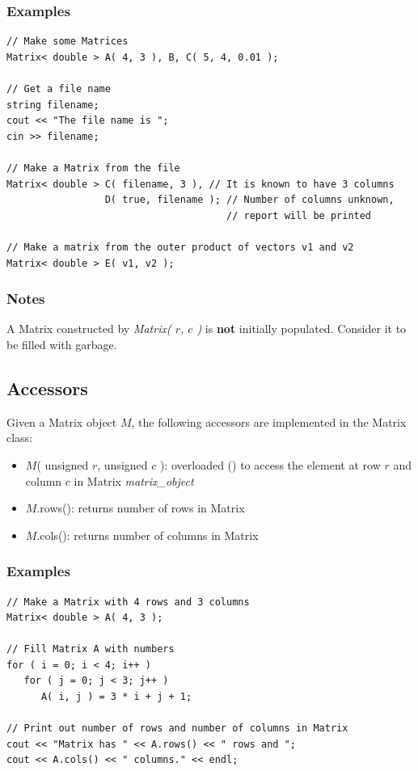 \documentclass{report}
\begin{document}
\subsubsection{Examples}

\begin{verbatim}
// Make some Matrices
Matrix< double > A( 4, 3 ), B, C( 5, 4, 0.01 );

// Get a file name
string filename;
cout << "The file name is ";
cin >> filename;

// Make a Matrix from the file
Matrix< double > C( filename, 3 ), // It is known to have 3 columns
                 D( true, filename ); // Number of columns unknown,
                                      // report will be printed

// Make a matrix from the outer product of vectors v1 and v2
Matrix< double > E( v1, v2 );
\end{verbatim}

\subsubsection{Notes}

A Matrix constructed by {\em Matrix( $r$, $c$ )} is {\bf not}
initially populated.  Consider it to be filled with garbage.

\subsection{Accessors}

Given a Matrix object $M$, the following accessors are implemented in
the Matrix class:

\begin{itemize}
\item $M$( unsigned $r$, unsigned $c$ ): overloaded () to
      access the element at row $r$ and column $c$ in Matrix
      {\em matrix\_object}
\item $M$.rows(): returns number of rows in Matrix
\item $M$.cols(): returns number of columns in Matrix
\end{itemize}

\subsubsection{Examples}
\begin{verbatim}
// Make a Matrix with 4 rows and 3 columns
Matrix< double > A( 4, 3 );

// Fill Matrix A with numbers
for ( i = 0; i < 4; i++ )
   for ( j = 0; j < 3; j++ )
      A( i, j ) = 3 * i + j + 1;

// Print out number of rows and number of columns in Matrix
cout << "Matrix has " << A.rows() << " rows and ";
cout << A.cols() << " columns." << endl;

\end{verbatim}
\end{document}
